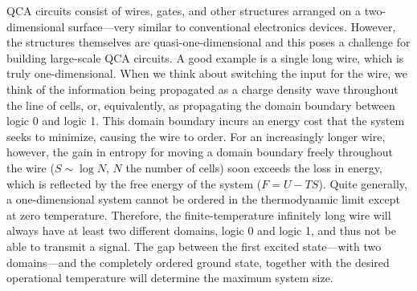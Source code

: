 QCA circuits consist of wires, gates, and other structures arranged on a
two-dimensional surface---very similar to conventional electronics devices.
However, the structures themselves are quasi-one-dimensional and this poses a
challenge for building large-scale QCA circuits. A good example is a single long
wire, which is truly one-dimensional. When we think about switching the input
for the wire, we think of the information being propagated as a charge density
wave throughout the line of cells, or, equivalently, as propagating the domain
boundary between logic 0 and logic 1. This domain boundary incurs an energy cost
that the system seeks to minimize, causing the wire to order. For an
increasingly longer wire, however, the gain in entropy for moving a domain
boundary freely throughout the wire ($S \sim \log N$, $N$ the number of cells)
soon exceeds the loss in energy, which is reflected by the free energy of the
system ($F = U - T S$). Quite generally, a one-dimensional system cannot be
ordered in the thermodynamic limit except at zero temperature. Therefore, the
finite-temperature infinitely long wire will always have at least two different
domains, logic 0 and logic 1, and thus not be able to transmit a signal. The gap
between the first excited state---with two domains---and the completely ordered
ground state, together with the desired operational temperature will determine
the maximum system size.

